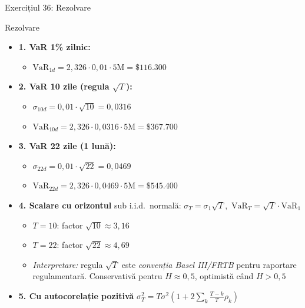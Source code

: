 \documentclass[9pt, aspectratio=169, t]{beamer}
\begin{document}
\begin{frame}[shrink=25]{Exercițiul 36: Rezolvare}
\begin{cminipage}{0.95\textwidth}
\begin{exampleblock}{Rezolvare}
\begin{itemize}\setlength{\itemsep}{0pt}
    \item \textbf{1. VaR 1\% zilnic:}
    \begin{itemize}\setlength{\itemsep}{0pt}
        \item $\text{VaR}_{1d} = 2{,}326 \cdot 0{,}01 \cdot 5\text{M} = \mathbf{\$116.300}$
    \end{itemize}
    \item \textbf{2. VaR 10 zile (regula $\sqrt{T}$):}
    \begin{itemize}\setlength{\itemsep}{0pt}
        \item $\sigma_{10d} = 0{,}01 \cdot \sqrt{10} = 0{,}0316$
        \item $\text{VaR}_{10d} = 2{,}326 \cdot 0{,}0316 \cdot 5\text{M} = \mathbf{\$367.700}$
    \end{itemize}
    \item \textbf{3. VaR 22 zile (1 lună):}
    \begin{itemize}\setlength{\itemsep}{0pt}
        \item $\sigma_{22d} = 0{,}01 \cdot \sqrt{22} = 0{,}0469$
        \item $\text{VaR}_{22d} = 2{,}326 \cdot 0{,}0469 \cdot 5\text{M} = \mathbf{\$545.400}$
    \end{itemize}
    \item \textbf{4. Scalare cu orizontul} \quad sub i.i.d.\ normală: $\sigma_T = \sigma_1\sqrt{T}$,\ $\text{VaR}_T = \sqrt{T} \cdot \text{VaR}_1$
    \begin{itemize}\setlength{\itemsep}{0pt}
        \item $T = 10$: factor $\sqrt{10} \approx 3{,}16$
        \item $T = 22$: factor $\sqrt{22} \approx 4{,}69$
        \item \textit{Interpretare:} regula $\sqrt T$ este \emph{convenția Basel III/FRTB} pentru raportare regulamentară. Conservativă pentru $H \approx 0{,}5$, optimistă când $H > 0{,}5$
    \end{itemize}
    \item \textbf{5. Cu autocorelație pozitivă} \quad $\sigma_T^2 = T\sigma^2\left(1 + 2\sum_k \tfrac{T-k}{T}\rho_k\right)$
    \begin{itemize}\setlength{\itemsep}{0pt}

\end{itemize}
\end{itemize}
\end{exampleblock}
\end{cminipage}
\end{frame}
\end{document}
